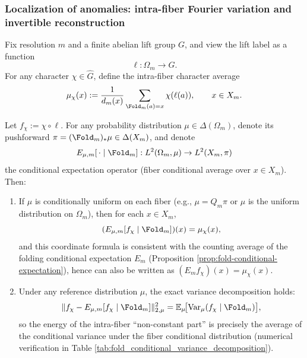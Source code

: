 \subsubsection{Localization of anomalies: intra-fiber Fourier variation and invertible reconstruction}\label{subsec:pom-anom-localization-fourier}
\begin{definition}\label{def:pom-fiber-fourier-coeff}
Fix resolution \(m\) and a finite abelian lift group \(G\), and view the lift label as a function
$$
\ell:\Omega_m\to G.
$$
For any character \(\chi\in\widehat G\), define the intra-fiber character average
$$
\mu_\chi(x):=\frac{1}{d_m(x)}\sum_{\Fold_m(a)=x}\chi(\ell(a)),
\qquad x\in X_m.
$$
\end{definition}
\begin{proposition}\label{prop:pom-fiber-fourier-variance}
Let \(f_\chi:=\chi\circ \ell\).
For any probability distribution \(\mu\in\Delta(\Omega_m)\), denote its pushforward \(\pi=(\Fold_m)_*\mu\in\Delta(X_m)\), and denote
\[
E_{\mu,m}[\,\cdot\mid\Fold_m]:L^2(\Omega_m,\mu)\to L^2(X_m,\pi)
\]
the conditional expectation operator (fiber conditional average over \(x\in X_m\)).
Then:
\begin{enumerate}
  \item If \(\mu\) is conditionally uniform on each fiber (e.g., \(\mu=Q_m\pi\) or \(\mu\) is the uniform distribution on \(\Omega_m\)), then for each \(x\in X_m\),
  \[
  (E_{\mu,m}[f_\chi\mid\Fold_m])(x)=\mu_\chi(x),
  \]
  and this coordinate formula is consistent with the counting average of the folding conditional expectation \(E_m\) (Proposition \ref{prop:fold-conditional-expectation}), hence can also be written as \((E_m f_\chi)(x)=\mu_\chi(x)\).
  \item Under any reference distribution \(\mu\), the exact variance decomposition holds:
  $$
  \|f_\chi-E_{\mu,m}[f_\chi\mid\Fold_m]\|_{2,\mu}^2
  =
  \mathbb{E}_\mu\!\big[\mathrm{Var}_\mu(f_\chi\mid \Fold_m)\big],
  $$
  so the energy of the intra-fiber ``non-constant part'' is precisely the average of the conditional variance under the fiber conditional distribution (numerical verification in Table \ref{tab:fold_conditional_variance_decomposition}).
\end{enumerate}
\end{proposition}

